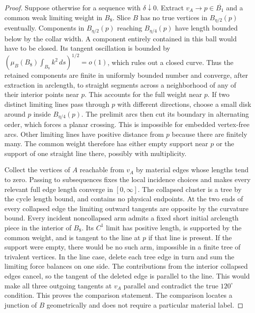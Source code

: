 \begin{proof}
Suppose otherwise for a sequence with \(\delta\downarrow0\). Extract \(v_A\to p\in\overline{B_1}\) and a common weak limiting weight in \(B_8\). Slice \(B\) has no true vertices in \(B_{\eta/2}(p)\) eventually. Components in \(B_{\eta/2}(p)\) reaching \(B_{\eta/4}(p)\) have length bounded below by the collar width. A component entirely contained in this ball would have to be closed. Its tangent oscillation is bounded by \((\mu_B(B_8)\int_{B_8}k^2\,ds)^{1/2}=o(1)\), which rules out a closed curve. Thus the retained components are finite in uniformly bounded number and converge, after extraction in arclength, to straight segments across a neighborhood of any of their interior points near \(p\). This accounts for the full weight near \(p\). If two distinct limiting lines pass through \(p\) with different directions, choose a small disk around \(p\) inside \(B_{\eta/4}(p)\). The prelimit arcs then cut its boundary in alternating order, which forces a planar crossing. This is impossible for embedded vertex-free arcs. Other limiting lines have positive distance from \(p\) because there are finitely many. The common weight therefore has either empty support near \(p\) or the support of one straight line there, possibly with multiplicity.

Collect the vertices of \(A\) reachable from \(v_A\) by material edges whose lengths tend to zero. Passing to subsequences fixes the local incidence choices and makes every relevant full edge length converge in \([0,\infty]\). The collapsed cluster is a tree by the cycle length bound, and contains no physical endpoints. At the two ends of every collapsed edge the limiting outward tangents are opposite by the curvature bound. Every incident noncollapsed arm admits a fixed short initial arclength piece in the interior of \(B_8\). Its \(C^1\) limit has positive length, is supported by the common weight, and is tangent to the line at \(p\) if that line is present. If the support were empty, there would be no such arm, impossible in a finite tree of trivalent vertices. In the line case, delete each tree edge in turn and sum the limiting force balances on one side. The contributions from the interior collapsed edges cancel, so the tangent of the deleted edge is parallel to the line. This would make all three outgoing tangents at \(v_A\) parallel and contradict the true \(120^\circ\) condition. This proves the comparison statement. The comparison locates a junction of \(B\) geometrically and does not require a particular material label.
\end{proof}

